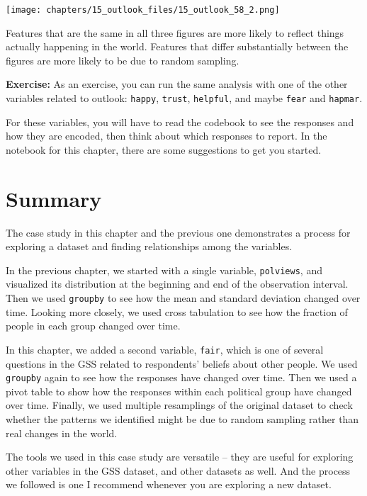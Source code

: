 \begin{center}
\texttt{[image: chapters/15\_outlook\_files/15\_outlook\_58\_2.png]}
\end{center}

Features that are the same in all three figures are more likely to
reflect things actually happening in the world. Features that differ
substantially between the figures are more likely to be due to random
sampling.

\textbf{Exercise:} As an exercise, you can run the same analysis with
one of the other variables related to outlook:
\passthrough{\lstinline!happy!}, \passthrough{\lstinline!trust!},
\passthrough{\lstinline!helpful!}, and maybe
\passthrough{\lstinline!fear!} and \passthrough{\lstinline!hapmar!}.

For these variables, you will have to read the codebook to see the
responses and how they are encoded, then think about which responses to
report. In the notebook for this chapter, there are some suggestions to
get you started.

\section{Summary}\label{summary}

The case study in this chapter and the previous one demonstrates a
process for exploring a dataset and finding relationships among the
variables.

In the previous chapter, we started with a single variable,
\passthrough{\lstinline!polviews!}, and visualized its distribution at
the beginning and end of the observation interval. Then we used
\passthrough{\lstinline!groupby!} to see how the mean and standard
deviation changed over time. Looking more closely, we used cross
tabulation to see how the fraction of people in each group changed over
time.

In this chapter, we added a second variable,
\passthrough{\lstinline!fair!}, which is one of several questions in the
GSS related to respondents' beliefs about other people. We used
\passthrough{\lstinline!groupby!} again to see how the responses have
changed over time. Then we used a pivot table to show how the responses
within each political group have changed over time. Finally, we used
multiple resamplings of the original dataset to check whether the
patterns we identified might be due to random sampling rather than real
changes in the world.

The tools we used in this case study are versatile -- they are useful
for exploring other variables in the GSS dataset, and other datasets as
well. And the process we followed is one I recommend whenever you are
exploring a new dataset.

